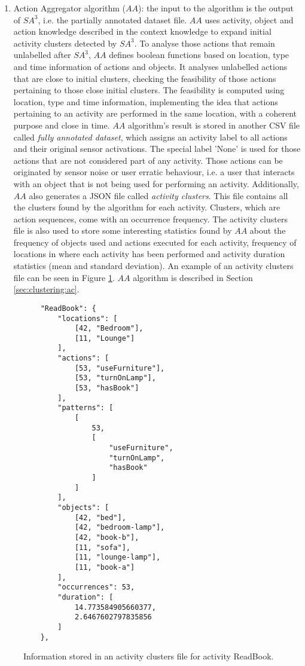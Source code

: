 \begin{enumerate}
 \item Action Aggregator algorithm ($AA$): the input to the algorithm is the output of $SA^3$, i.e. the partially annotated dataset file. $AA$ uses activity, object and action knowledge described in the context knowledge to expand initial activity clusters detected by $SA^3$. To analyse those actions that remain unlabelled after $SA^3$, $AA$ defines boolean functions based on location, type and time information of actions and objects. It analyses unlabelled actions that are close to initial clusters, checking the feasibility of those actions pertaining to those close initial clusters. The feasibility is computed using location, type and time information, implementing the idea that actions pertaining to an activity are performed in the same location, with a coherent purpose and close in time. $AA$ algorithm's result is stored in another CSV file called \textit{fully annotated dataset}, which assigns an activity label to all actions and their original sensor activations. The special label 'None' is used for those actions that are not considered part of any activity. Those actions can be originated by sensor noise or user erratic behaviour, i.e. a user that interacts with an object that is not being used for performing an activity. Additionally, $AA$ also generates a JSON file called \textit{activity clusters}. This file contains all the clusters found by the algorithm for each activity. Clusters, which are action sequences, come with an occurrence frequency. The activity clusters file is also used to store some interesting statistics found by $AA$ about the frequency of objects used and actions executed for each activity, frequency of locations in where each activity has been performed and activity duration statistics (mean and standard deviation). An example of an activity clusters file can be seen in Figure \ref{fig-clusters-file}. $AA$ algorithm is described in Section \ref{sec:clustering:ac}.
\end{enumerate}

\begin{figure}[htbp]
\begin{small}
\begin{lstlisting}
    "ReadBook": {
        "locations": [
            [42, "Bedroom"], 
            [11, "Lounge"]
        ], 
        "actions": [
            [53, "useFurniture"], 
            [53, "turnOnLamp"], 
            [53, "hasBook"]
        ], 
        "patterns": [
            [
                53, 
                [
                    "useFurniture", 
                    "turnOnLamp", 
                    "hasBook"
                ]
            ]
        ], 
        "objects": [
            [42, "bed"], 
            [42, "bedroom-lamp"], 
            [42, "book-b"], 
            [11, "sofa"], 
            [11, "lounge-lamp"], 
            [11, "book-a"]
        ], 
        "occurrences": 53, 
        "duration": [
            14.773584905660377, 
            2.6467602797835856
        ]
    }, 
\end{lstlisting}
\end{small}
\caption{Information stored in an activity clusters file for activity ReadBook.}
\label{fig-clusters-file}
\end{figure}


